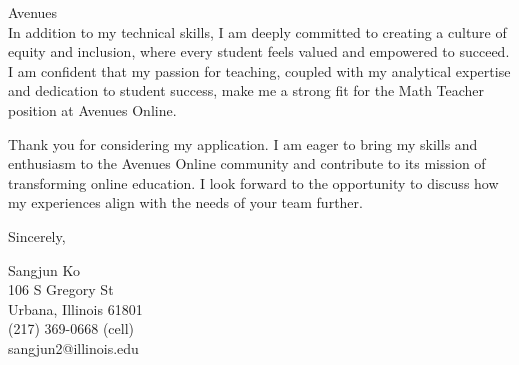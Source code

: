\documentclass{letter}
\begin{document}
\begin{letter}{Avenues\\
}
In addition to my technical skills, I am deeply committed to creating
 a culture of equity and inclusion, where every student feels valued 
 and empowered to succeed. I am confident that my passion for 
 teaching, coupled with my analytical expertise and dedication 
 to student success, make me a strong fit for the Math Teacher 
 position at Avenues Online.

Thank you for considering my application. 
I am eager to bring my skills and enthusiasm to the 
Avenues Online community and contribute to its mission 
of transforming online education. I look forward to the
 opportunity to discuss how my experiences align with the 
 needs of your team further.

\closing{Sincerely,
}

Sangjun Ko\\
106 S Gregory St\\
Urbana, Illinois 61801\\
(217) 369-0668 (cell)\\sangjun2@illinois.edu
\end{letter}
\end{document}
